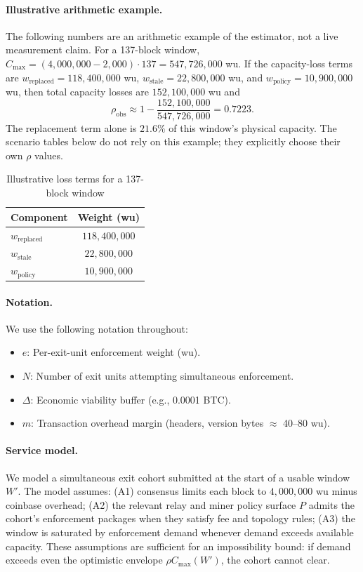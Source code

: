 \documentclass{article}
\theoremstyle{definition}
\begin{document}
\paragraph{Illustrative arithmetic example.}
The following numbers are an arithmetic example of the estimator, not a live measurement claim. For a 137-block window, $C_{\max}=(4{,}000{,}000-2{,}000)\cdot137=547{,}726{,}000$ wu. If the capacity-loss terms are $w_{\mathrm{replaced}}=118{,}400{,}000$ wu, $w_{\mathrm{stale}}=22{,}800{,}000$ wu, and $w_{\mathrm{policy}}=10{,}900{,}000$ wu, then total capacity losses are $152{,}100{,}000$ wu and
\small
\begin{equation*}
\rho_{\mathrm{obs}} \approx 1 - \frac{152{,}100{,}000}{547{,}726{,}000} = 0.7223.
\end{equation*}
\normalsize
The replacement term alone is $21.6\%$ of this window's physical capacity. The scenario tables below do not rely on this example; they explicitly choose their own $\rho$ values.

\begin{table}[h]
\centering
\caption{Illustrative loss terms for a 137-block window}\label{tab:rhoLosses}
\begin{tabular}{@{}lc@{}}
\toprule
Component & Weight (wu) \\
\midrule
$w_{\mathrm{replaced}}$ & $118{,}400{,}000$ \\
$w_{\mathrm{stale}}$ & $22{,}800{,}000$ \\
$w_{\mathrm{policy}}$ & $10{,}900{,}000$ \\
\bottomrule
\end{tabular}
\end{table}

\paragraph{Notation.} We use the following notation throughout:
\begin{itemize}
    \itemsep0em
    \item $e$: Per-exit-unit enforcement weight (wu).
    \item $N$: Number of exit units attempting simultaneous enforcement.
    \item $\Delta$: Economic viability buffer (e.g., 0.0001 BTC).
    \item $m$: Transaction overhead margin (headers, version bytes $\approx$ 40--80 wu).
\end{itemize}


\paragraph{Service model.}
We model a simultaneous exit cohort submitted at the start of a usable window $W'$. The model assumes: (A1) consensus limits each block to $4{,}000{,}000$ wu minus coinbase overhead; (A2) the relevant relay and miner policy surface $P$ admits the cohort's enforcement packages when they satisfy fee and topology rules; (A3) the window is saturated by enforcement demand whenever demand exceeds available capacity. These assumptions are sufficient for an impossibility bound: if demand exceeds even the optimistic envelope $\rho C_{\max}(W')$, the cohort cannot clear.
\end{document}
